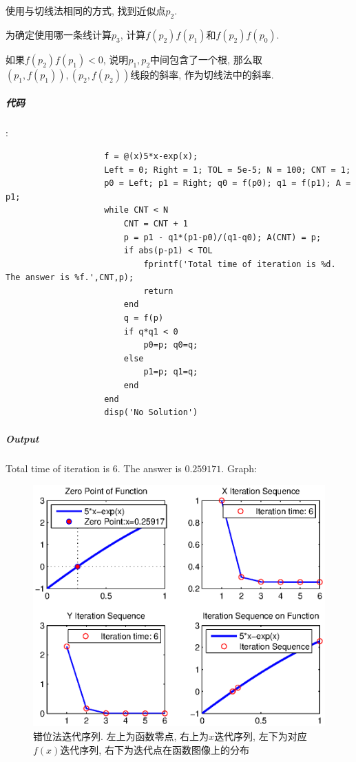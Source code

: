 \documentclass{article}
\begin{document}
\begin{CJK*}{UTF8}{song}
					使用与切线法相同的方式, 找到近似点$p_2$.
					
					为确定使用哪一条线计算$p_3$, 计算$f\left(p_2 \right) f\left(p_1 \right)$和$f\left( p_2\right) f\left(p_0 \right)$.
					
					如果$f\left(p_2 \right) f\left(p_1 \right) < 0$, 说明$p_1,p_2$中间包含了一个根, 那么取$\left(p_1,f\left(p_1\right) \right),\left(p_2,f\left(p_2 \right)\right)$线段的斜率, 作为切线法中的斜率.
				\subparagraph{代码}
					:\newline
					\begin{lstlisting}
					f = @(x)5*x-exp(x);
					Left = 0; Right = 1; TOL = 5e-5; N = 100; CNT = 1;
					p0 = Left; p1 = Right; q0 = f(p0); q1 = f(p1); A = p1;
					while CNT < N
						CNT = CNT + 1
						p = p1 - q1*(p1-p0)/(q1-q0); A(CNT) = p;
						if abs(p-p1) < TOL
							fprintf('Total time of iteration is %d. The answer is %f.',CNT,p);
							return
						end
						q = f(p)
						if q*q1 < 0
							p0=p; q0=q;
						else
							p1=p; q1=q;
						end
					end
					disp('No Solution')
					\end{lstlisting}
				\subparagraph{Output}
					Total time of iteration is $6$. The answer is $ 0.259171$.
					Graph:\\
					\begin{figure}[H]
						\centering
						\includegraphics[width=1.0\textwidth]{../chapter2_4_4.eps}
						\caption{错位法迭代序列. 左上为函数零点, 右上为$x$迭代序列, 左下为对应$f\left(x\right)$迭代序列, 右下为迭代点在函数图像上的分布}
						\label{img_chapter2_4_4}
					\end{figure}

\end{CJK*}
\end{document}
